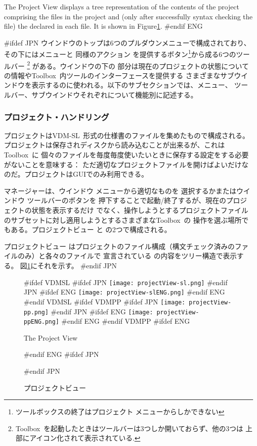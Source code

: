 \documentclass[\pformat,12pt]{article}
\newcommand{\vdmslpp}{VDM-SL}
\newcommand{\Toolbox}{Toolbox}
\newcommand{\vdmslpp}{VDM++}
\newcommand{\Toolbox}{Toolbox}
\newcommand{\guicmd}[1]{{\sf #1}}
\newcommand{\guicmd}[1]{{\gt #1}}
\begin{document}
The \guicmd{Project View} displays a tree representation of the contents
of the project comprising the files in the project and (only after
successfully syntax checking the file) the
 declared in each file. 
It is shown in Figure\ref{fig:projectView}.
#endif ENG

#ifdef JPN
ウインドウのトップは6つのプルダウンメニューで構成されており、その下にはメニューと
同様のアクション を提供するボタン\footnote{ツールボックスの終了は\guicmd{プロジェクト} 
メニューからしかできない}から成る6つのツールバー
\footnote{\Toolbox\ を起動したときはツールバーは3つしか開いておらず、他の3つは
上部にアイコン化されて表示されている.} 
がある。ウインドウの下の
部分は現在のプロジェクトの状態についての情報や\Toolbox\ 内ツールのインターフェースを提供する
さまざまなサブウインドウを表示するのに使われる。以下のサブセクションでは、メニュー、
ツールバー、サブウインドウそれぞれについて機能別に記述する。

\subsubsection{プロジェクト・ハンドリング}
プロジェクトは\vdmslpp\ 形式の仕様書のファイルを集めたもので構成される。
プロジェクトは保存されディスクから読み込むことが出来るが、これは\Toolbox\ に
個々のファイルを毎度毎度使いたいときに保存する設定をする必要がないことを意味する：
ただ適切なプロジェクトファイルを開けばよいだけなのだ。プロジェクトはGUIでのみ利用できる。

\guicmd{マネージャー}は、\guicmd{ウインドウ} メニューから適切なものを
選択するかまたは\guicmd{ウインドウ} 
ツールバーのボタンを
押下することで起動/終了するが、現在のプロジェクトの状態を表示するだけ
でなく、操作しようとするプロジェクトファイルのサブセットに対し適用しようとするさまざまな\Toolbox\ の
操作を選ぶ場所でもある。\guicmd{プロジェクトビュー} と
\ifthenelse{\boolean{VDMsl}}{\guicmd{モジュールビュー}}{\guicmd{クラスビュー}}
の2つで構成される。

\guicmd{プロジェクトビュー} はプロジェクトのファイル構成（構文チェック済みのファイルのみ）と各々のファイルで
宣言されている
 の内容をツリー構造で表示する。
図\ref{fig:projectView}にそれを示す。
#endif JPN

\begin{figure}[tbh]
\begin{center}
\mbox{}
#ifdef VDMSL
#ifdef JPN
\texttt{[image: projectView-sl.png]}
#endif JPN
#ifdef ENG
\texttt{[image: projectView-slENG.png]}
#endif ENG
#endif VDMSL
#ifdef VDMPP
#ifdef JPN
\texttt{[image: projectView-pp.png]}
#endif JPN
#ifdef ENG
\texttt{[image: projectView-ppENG.png]}
#endif ENG
#endif VDMPP
#ifdef ENG
\caption{The Project View}
#endif ENG
#ifdef JPN
\caption{プロジェクトビュー}
#endif JPN
\label{fig:projectView}
\end{center}
\end{figure}
\end{document}
